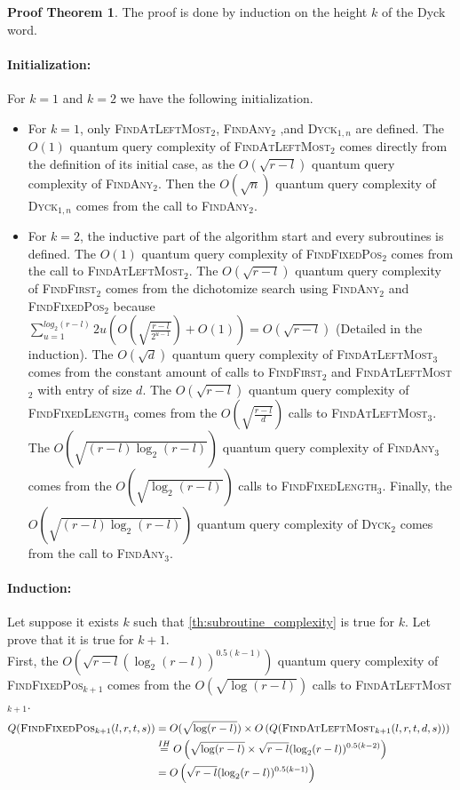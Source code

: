 \documentclass[11pt,a4paper]{article}
\newcommand{\Dyck}[1]{\textsc{Dyck$_{#1}$}}
\newcommand{\FA}[1]{\textsc{FindAny$_{#1}$}}
\newcommand{\FFL}[1]{\textsc{FindFixedLength$_{#1}$}}
\newcommand{\FFP}[1]{\textsc{FindFixedPos$_{#1}$}}
\newcommand{\FALM}[1]{\textsc{FindAtLeftMost$_{#1}$}}
\newcommand{\FF}[1]{\textsc{FindFirst$_{#1}$}}
\newcommand{\hered}[1]{\paragraph*{Induction:}{#1}}
\newcommand{\init}[1]{\paragraph*{Initialization:}{#1}}
\theoremstyle{definition}
\theoremstyle{plain}
\theoremstyle{definition}
\newtheorem{tproof}{Proof Theorem}[section]
\begin{document}
\begin{appendix}
    \begin{tproof} The proof is done by induction on the height $k$ of the Dyck word.
        \init{For $k=1$ and $k=2$ we have the following initialization. \\
            \begin{itemize}
                \item For $k=1$, only \FALM{2}, \FA{2} ,and \Dyck{1,n} are defined. The $O(1)$ quantum query complexity
                      of \FALM{2} comes directly from the definition of its initial case, as the $O(\sqrt{r-l})$ quantum
                      query complexity of \FA{2}. Then the $O\left(\sqrt{n}\right)$ quantum query complexity of \Dyck{1,n} comes from
                      the call to \FA{2}.
                \item For $k=2$, the inductive part of the algorithm start and every subroutines is defined. The $O(1)$
                      quantum query complexity of \FFP{2} comes from the call to \FALM{2}.
                      The $O\left(\sqrt{r-l}\right)$ quantum query complexity of \FF{2} comes from the dichotomize search using \FA{2} and
                      \FFP{2} because $\sum_{u=1}^{log_2(r-l)}2u\left(O\left(\sqrt{\frac{r-l}{2^{u-1}}}\right)+O(1)\right) = O(\sqrt{r-l})$
                      (Detailed in the induction). The $O(\sqrt{d})$ quantum query complexity of \FALM{3} comes from the
                      constant amount of calls to \FF{2} and \FALM{2} with entry of size $d$. The $O(\sqrt{r-l})$ quantum query
                      complexity of \FFL{3} comes from the $O\left(\sqrt{\frac{r-l}{d}}\right)$ calls to \FALM{3}. The $O\left(\sqrt{(r-l)\log_2(r-l)}\right)$
                      quantum query complexity of \FA{3} comes from the $O\left(\sqrt{\log_2(r-l)}\right)$ calls to \FFL{3}. Finally, the
                      $O\left(\sqrt{(r-l)\log_2(r-l)}\right)$ quantum query complexity of \Dyck{2} comes from the call to \FA{3}.
            \end{itemize}
        }
        \hered{Let suppose it exists $k$ such that \autoref{th:subroutine_complexity} is
            true for $k$. Let prove that it is true for $k+1$. \\

            First, the $O\left(\sqrt{r-l}(\log_2(r-l))^{0.5(k-1)}\right)$ quantum query complexity of \FFP{k+1} comes from
            the $O\left(\sqrt{\log(r-l)}\right)$ calls to \FALM{k+1}.
            \begin{align*}
                Q(\textrm{\FFP{k+1}}(l, r, t, s)) & = O(\sqrt{\log(r-l)}) \times O\left(Q(\textrm{\FALM{k+1}}(l, r, t, d, s))\right)\            \\
                                                  & \overset{IH}{=} O \left( \sqrt{\log(r-l)} \times \sqrt{r-l}(\log_2(r-l))^{0.5(k-2)}  \right) \\
                                                  & = O \left( \sqrt{r-l}(\log_2(r-l))^{0.5(k-1)} \right)
            \end{align*}

}
\end{tproof}
\end{appendix}
\end{document}
